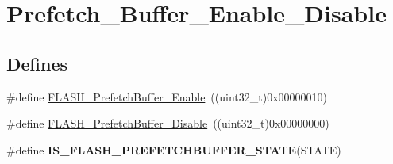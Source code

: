 \hypertarget{group__Prefetch__Buffer__Enable__Disable}{
\section{Prefetch\_\-Buffer\_\-Enable\_\-Disable}
\label{group__Prefetch__Buffer__Enable__Disable}
}
\subsection*{Defines}
\begin{DoxyCompactItemize}
\item 
\#define \hyperlink{group__Prefetch__Buffer__Enable__Disable_gad0fac43d078a77794f22840f326a6ed9}{FLASH\_\-PrefetchBuffer\_\-Enable}~((uint32\_\-t)0x00000010)
\item 
\#define \hyperlink{group__Prefetch__Buffer__Enable__Disable_ga2feb631ad85449f83517f05aaf4ba26c}{FLASH\_\-PrefetchBuffer\_\-Disable}~((uint32\_\-t)0x00000000)
\item 
\#define {\bfseries IS\_\-FLASH\_\-PREFETCHBUFFER\_\-STATE}(STATE)
\end{DoxyCompactItemize}


